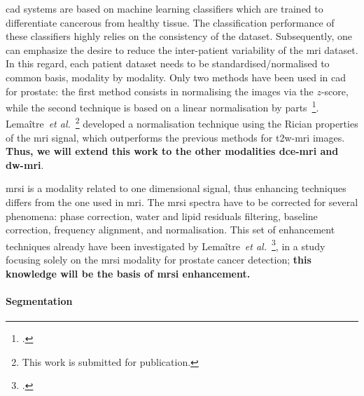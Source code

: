 \ac{cad} systems are based on machine learning classifiers which are trained to differentiate cancerous from healthy tissue.
The classification performance of these classifiers highly relies on the consistency of the dataset.
Subsequently, one can emphasize the desire to reduce the inter-patient variability of the \ac{mri} dataset.
In this regard, each patient dataset needs to be standardised/normalised to common basis, modality by modality.
Only two methods have been used in \ac{cad} for prostate: the first method consists in normalising the images via the $z$-score, while the second technique is based on a linear normalisation by parts~\footcite{Madabhushi2006a}.
Lema\^itre~\emph{et al.}~\footnote{This work is submitted for publication.} developed a normalisation technique using the Rician properties of the \ac{mri} signal, which outperforms the previous methods for \ac{t2w}-\ac{mri} images.
\textbf{Thus, we will extend this work to the other modalities \ac{dce}-\ac{mri} and \ac{dw}-\ac{mri}}.

\ac{mrsi} is a modality related to one dimensional signal, thus enhancing techniques differs from the one used in \ac{mri}.
The \ac{mrsi} spectra have to be corrected for several phenomena: phase correction, water and lipid residuals filtering, baseline correction, frequency alignment, and normalisation.
This set of enhancement techniques already have been investigated by Lema\^itre~\emph{et al.}~\footcite{Lemaitre2011}, in a study focusing solely on the \ac{mrsi} modality for prostate cancer detection; \textbf{this knowledge will be the basis of \ac{mrsi} enhancement.}

\paragraph{Segmentation}

